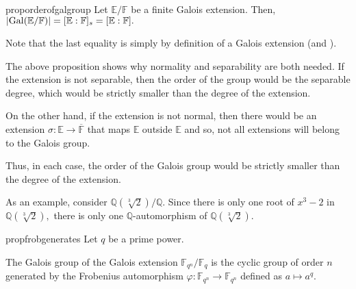 \begin{restatable}[]{prop}{orderofgalgroup}
\label{prop:orderofgalgroup}
    Let $\mathbb{E}/\mathbb{F}$ be a finite Galois extension. Then, ${\left\lvert \operatorname{Gal}(\mathbb{E}/\mathbb{F}) \right\lvert} = [\mathbb{E} : \mathbb{F}]_s = [\mathbb{E} : \mathbb{F}].$ \hfill\hyperref[prop:orderofgalgroup2]{\downsym}
\end{restatable}
Note that the last equality is simply by definition of a Galois extension (and ).

\begin{rem}
    The above proposition shows why normality and separability are both needed. If the extension is not separable, then the order of the group would be the separable degree, which would be strictly smaller than the degree of the extension.

    On the other hand, if the extension is not normal, then there would be an extension $\sigma : \mathbb{E} \to \overline{\mathbb{F}}$ that maps $\mathbb{E}$ outside $\mathbb{E}$ and so, not all extensions will belong to the Galois group.

    Thus, in each case, the order of the Galois group would be strictly smaller than the degree of the extension.

    As an example, consider $\mathbb{Q}(\sqrt[3]{2})/\mathbb{Q}.$ Since there is only one root of $x^3 - 2$ in $\mathbb{Q}(\sqrt[3]{2}),$ there is only one $\mathbb{Q}$-automorphism of $\mathbb{Q}(\sqrt[3]{2}).$
\end{rem}

\begin{restatable}[]{prop}{frobgenerates}
\label{prop:frobgenerates}
    Let $q$ be a prime power.

    The Galois group of the Galois extension $\mathbb{F}_{q^n}/\mathbb{F}_q$ is the cyclic group of order $n$ generated by the Frobenius automorphism $\varphi : \mathbb{F}_{q^n} \to \mathbb{F}_{q^n}$ defined as $a \mapsto a^q.$ \hfill\hyperref[prop:frobgenerates2]{\downsym}
\end{restatable}

